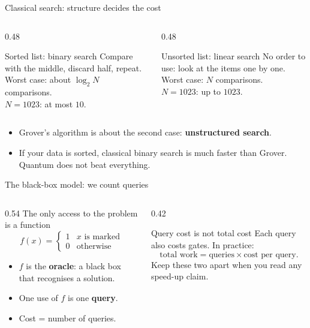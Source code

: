 \documentclass[aspectratio=169,11pt]{beamer}
\newcommand{\key}[1]{{\color{qdark}\textbf{#1}}}
\begin{document}
\begin{frame}{Classical search: structure decides the cost}
  \begin{columns}[T]
    \begin{column}{0.48\textwidth}
      \begin{block}{Sorted list: binary search}
        Compare with the middle, discard half, repeat.\\[1mm]
        Worst case: about $\log_2 N$ comparisons.\\
        $N = 1023$: at most $10$.
      \end{block}
    \end{column}
    \begin{column}{0.48\textwidth}
      \begin{alertblock}{Unsorted list: linear search}
        No order to use: look at the items one by one.\\[1mm]
        Worst case: $N$ comparisons.\\
        $N = 1023$: up to $1023$.
      \end{alertblock}
    \end{column}
  \end{columns}
  \vspace{3mm}
  \begin{itemize}
    \item Grover's algorithm is about the second case: \key{unstructured search}.
    \item If your data is sorted, classical binary search is much faster than Grover. Quantum does not beat everything.
  \end{itemize}
\end{frame}

\begin{frame}{The black-box model: we count queries}
  \begin{columns}[T]
    \begin{column}{0.54\textwidth}
      The only access to the problem is a function
      \[ f(x) = \begin{cases} 1 & x \text{ is marked}\\ 0 & \text{otherwise}\end{cases} \]
      \begin{itemize}
        \item $f$ is the \key{oracle}: a black box that recognises a solution.
        \item One use of $f$ is one \key{query}.
        \item Cost = number of queries.
      \end{itemize}
    \end{column}
    \begin{column}{0.42\textwidth}
      \begin{alertblock}{Query cost is not total cost}
        Each query also costs gates. In practice:
        \[ \text{total work} = \text{queries} \times \text{cost per query}. \]
        Keep these two apart when you read any speed-up claim.
      \end{alertblock}
    \end{column}
  \end{columns}
\end{frame}
\end{document}
